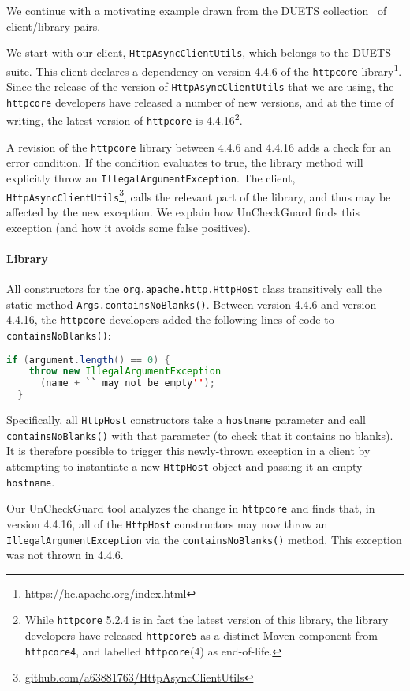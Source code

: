We continue with a motivating example drawn from the DUETS collection~\cite{durieux21:_duets}
of client/library pairs. 

We start with our client, \texttt{HttpAsyncClientUtils}, which belongs to the DUETS suite. This client declares a dependency on
version 4.4.6 of the \texttt{httpcore} library\footnote{https://hc.apache.org/index.html}. Since the release of the version of \texttt{HttpAsyncClientUtils} that we are using, the \texttt{httpcore} developers
have released a number of new versions, and at the time of writing, the latest version of \texttt{httpcore}
is 4.4.16\footnote{While \texttt{httpcore} 5.2.4 is in fact the latest version of this library, the library developers have released \texttt{httpcore5} as a distinct Maven component from \texttt{httpcore4}, and labelled \texttt{httpcore}(4) as end-of-life.}.

A revision of the \texttt{httpcore} library between 4.4.6 and 4.4.16 adds a check for an
error condition.  If the condition evaluates to true, the library method will
explicitly throw an \texttt{IllegalArgumentException}. The client, \texttt{HttpAsyncClientUtils}\footnote{\url{github.com/a63881763/HttpAsyncClientUtils}},
calls the relevant part of the library, and thus may be affected by the new exception. We explain how UnCheckGuard finds this exception (and how it avoids some false positives).


\paragraph{Library} All constructors for the \texttt{org.apache.http.HttpHost} class transitively call
the static method \texttt{Args.containsNoBlanks()}. Between version 4.4.6 and version 4.4.16, the \texttt{httpcore}
developers added the following lines of code to \texttt{containsNoBlanks()}:
\begin{lstlisting}[language=Java]
  if (argument.length() == 0) {
    throw new IllegalArgumentException
      (name + `` may not be empty'');
  }
\end{lstlisting}
Specifically, all \texttt{HttpHost} constructors take a \texttt{hostname} parameter and call \texttt{containsNoBlanks()}
with that parameter (to check that it contains no blanks). It is therefore possible to trigger this newly-thrown
exception in a client by attempting to instantiate a new \texttt{HttpHost} object and passing it an empty
\texttt{hostname}.

Our UnCheckGuard tool analyzes the change in \texttt{httpcore} and finds that, in
version 4.4.16, all of the \texttt{HttpHost} constructors may now throw an
\texttt{IllegalArgumentException} via the \texttt{containsNoBlanks()} method.
This exception was not thrown in 4.4.6.

